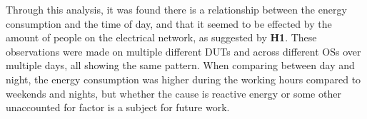 Through this analysis, it was found there is a relationship between the energy consumption and the time of day, and that it seemed to be effected by the amount of people on the electrical network, as suggested by \textbf{H1}. These observations were made on multiple different DUTs and across different OSs over multiple days, all showing the same pattern. When comparing between day and night, the energy consumption was higher during the working hours compared to weekends and nights, but whether the cause is reactive energy or some other unaccounted for factor is a subject for future work.









